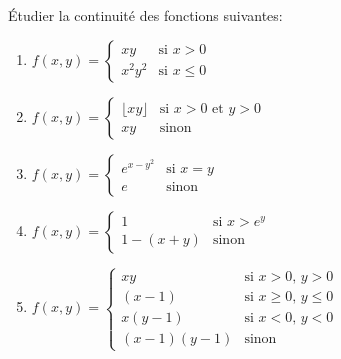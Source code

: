 
\begin{exercice}\label{exocontinueSup0003}

 Étudier la continuité des fonctions suivantes:
	\begin{enumerate}
		\item $f(x,y)=
			\begin{cases}
				xy	&	\text{si $x>0$}\\
				x^2y^2	&	 \text{si $x\leq 0$}
			\end{cases}$

		\item $f(x,y)= 
			\begin{cases}
				\lfloor xy\rfloor	&	\text{si $x>0$ et $y>0$}\\
				xy	&	 \text{sinon}
			\end{cases}$

		\item $f(x,y)=
			\begin{cases}
				 e^{x-y^2}	&	\text{si $x=y$}\\
				e	&	 \text{sinon}
			\end{cases}$

		\item $f(x,y)=
			\begin{cases}
				1&	\text{si $x>e^y$}\\
				1-(x+y)	&	 \text{sinon}
			\end{cases}$

									       
		\item $f(x,y)=
			\begin{cases}
				xy	&	\text{si $x>0$, $y>0$}\\
				(x-1)	&	 \text{si $x\geq 0$, $y\leq 0$}\\
				x(y-1)	&	 \text{si $x<0$, $y<0$}\\
				(x-1)(y-1)	&	 \text{sinon}
			\end{cases}$
	\end{enumerate}

\end{exercice}
